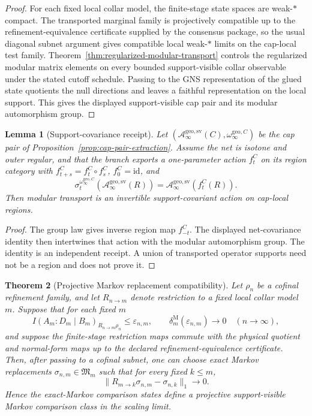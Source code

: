\documentclass[11pt]{article}
\newtheorem{theorem}{Theorem}[section]
\newtheorem{lemma}[theorem]{Lemma}
\begin{document}
\begin{proof}
For each fixed local collar model, the finite-stage state spaces are weak-\(*\) compact. The transported marginal family is projectively compatible up to the refinement-equivalence certificate supplied by the consensus package, so the usual diagonal subnet argument gives compatible local weak-\(*\) limits on the cap-local test family. Theorem~\ref{thm:regularized-modular-transport} controls the regularized modular matrix elements on every bounded support-visible collar observable under the stated cutoff schedule. Passing to the GNS representation of the glued state quotients the null directions and leaves a faithful representation on the local support. This gives the displayed support-visible cap pair and its modular automorphism group.
\end{proof}

\begin{lemma}[Support-covariance receipt]\label{lem:support-readable-modular-covariance}
Let \((\mathcal A_\infty^{\mathrm{geo,sv}}(C),\omega_\infty^{\mathrm{geo},C})\) be the cap pair
of Proposition~\ref{prop:cap-pair-extraction}. Assume the net is isotone and outer regular, and
that the branch exports a one-parameter action \(f_t^C\) on its region category with
\(f_{t+s}^C=f_t^C\circ f_s^C\), \(f_0^C=\mathrm{id}\), and
\[
\sigma_t^{\omega_\infty^{\mathrm{geo},C}}
\!\left(\mathcal A_\infty^{\mathrm{geo,sv}}(R)\right)
=
\mathcal A_\infty^{\mathrm{geo,sv}}\!\left(f_t^C(R)\right).
\]
Then modular transport is an invertible support-covariant action on cap-local regions.
\end{lemma}

\begin{proof}
The group law gives inverse region map \(f_{-t}^C\). The displayed net-covariance identity then
intertwines that action with the modular automorphism group. The identity is an independent
receipt. A union of transported operator supports need not be a region and does not prove it.
\end{proof}

\begin{theorem}[Projective Markov replacement compatibility]\label{thm:projective-markov-replacement}
Let \(\rho_n\) be a cofinal refinement family, and let \(R_{n\to m}\) denote
restriction to a fixed local collar model \(m\). Suppose that for each fixed
\(m\)
\[
I(A_m:D_m\mid B_m)_{R_{n\to m}\rho_n}\le \varepsilon_{n,m},
\qquad
\delta^{\mathrm M}_{m}(\varepsilon_{n,m})\to0
\quad(n\to\infty),
\]
and suppose the finite-stage restriction maps commute with the physical
quotient and normal-form maps up to the declared refinement-equivalence
certificate. Then, after passing to a cofinal subnet, one can choose exact
Markov replacements \(\sigma_{n,m}\in\mathfrak M_m\) such that for every fixed
\(k\le m\),
\[
\|R_{m\to k}\sigma_{n,m}-\sigma_{n,k}\|_1\to0.
\]
Hence the exact-Markov comparison states define a projective support-visible
Markov comparison class in the scaling limit.
\end{theorem}
\end{document}
